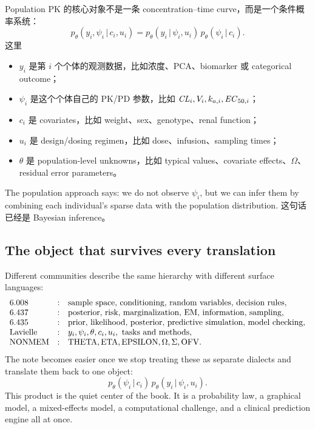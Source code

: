 \documentclass[a4paper]{article}
\newcommand{\given}{\,|\,}
\begin{document}
Population PK 的核心对象不是一条 concentration--time curve，而是一个条件概率系统：
\[
  p_\theta(y_i,\psi_i\given c_i,u_i)
  =
  p_\theta(y_i\given \psi_i,u_i)\,
  p_\theta(\psi_i\given c_i).
\]
这里
\begin{itemize}[leftmargin=2em]
  \item \(y_i\) 是第 \(i\) 个个体的观测数据，比如浓度、PCA、biomarker 或 categorical outcome；
  \item \(\psi_i\) 是这个个体自己的 PK/PD 参数，比如 \(\pksym{CL}_i,V_i,k_{a,i},\pksym{EC}_{50,i}\)；
  \item \(c_i\) 是 covariates，比如 weight、sex、genotype、renal function；
  \item \(u_i\) 是 design/dosing regimen，比如 dose、infusion、sampling times；
  \item \(\theta\) 是 population-level unknowns，比如 typical values、covariate effects、\(\Omega\)、residual error parameters。
\end{itemize}

The population approach says: we do not observe \(\psi_i\), but we can infer them by combining each individual's sparse data with the population distribution. 这句话已经是 Bayesian inference。

\subsection{The object that survives every translation}

Different communities describe the same hierarchy with different surface languages:
\[
  \begin{array}{lll}
    \text{6.008} &:& \text{sample space, conditioning, random variables, decision rules},\\
    \text{6.437} &:& \text{posterior, risk, marginalization, EM, information, sampling},\\
    \text{6.435} &:& \text{prior, likelihood, posterior, predictive simulation, model checking},\\
    \text{Lavielle} &:& y_i,\psi_i,\theta,c_i,u_i,\text{ tasks and methods},\\
    \text{NONMEM} &:& \mathrm{THETA},\mathrm{ETA},\mathrm{EPSILON},\Omega,\Sigma,\mathrm{OFV}.
  \end{array}
\]
The note becomes easier once we stop treating these as separate dialects and translate them back to one object:
\[
  p_\theta(\psi_i\given c_i)\,
  p_\theta(y_i\given \psi_i,u_i).
\]
This product is the quiet center of the book.  It is a probability law, a graphical model, a mixed-effects model, a computational challenge, and a clinical prediction engine all at once.
\end{document}
